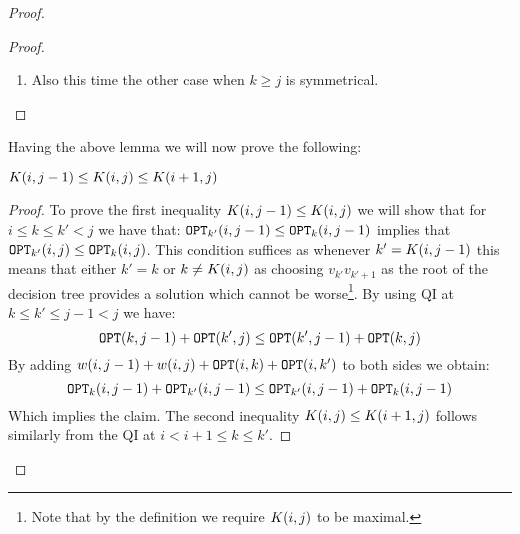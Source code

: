 \begin{theorem}
\begin{proof}
\begin{lemma}
\begin{proof}
\begin{enumerate}
\begin{enumerate}
        \begin{align*}
        &\OPT\br{i, j} + \OPT\br{i', j'} \\
        &\leq \OPT_z\br{i, j} + \OPT_y\br{i', j'} \\
        &=w\br{i, j} + w\br{i', j'} + \OPT\br{i, z} + \OPT_z\br{z+1, j} + \OPT_y\br{i', y} + \OPT_y\br{y+1, j'} \\
        &\leq w\br{i', j} + w\br{i, j'} + \OPT\br{i, z} + \OPT_y\br{i', y} + \OPT_z\br{y+1, j} + \OPT_y\br{z+1, j'}\\
        &= \OPT_y\br{i', j} + \OPT_z\br{i, j'} \\
        &= \OPT\br{i', j} + \OPT\br{i, j'}
        \end{align*}
        Where the first inequality and the first equality are due to the definition of $\OPT_k$, the second inequality is due to QI of $w$ and the induction hypothesis at $z\leq y<j < j'$ and the last two equalities are again due to the definition of $\OPT_k$.
        \item Also this time the other case when $k\geq j$ is symmetrical.
    \end{enumerate}
\end{enumerate} 
   \end{proof}
\end{lemma} 
Having the above lemma we will now prove the following:
\begin{lemma}
   $K\mathopen{}\left( i,j-1 \right)\leq K\mathopen{}\left( i,j \right)\leq K\mathopen{}\left( i +1,j \right)$
   \begin{proof}
   To prove the first inequality $K\mathopen{}\left( i,j-1 \right)\leq K\mathopen{}\left( i,j \right)$ we will show that for $i\leq k \leq k' < j$ we have that: $\texttt{OPT}_{k'}\mathopen{}\left( i, j - 1 \right) \leq \texttt{OPT}_{k}\mathopen{}\left( i, j - 1 \right)$ implies that $\texttt{OPT}_{k'}\mathopen{}\left( i, j \right) \leq \texttt{OPT}_{k}\mathopen{}\left( i, j \right)$. This condition suffices as whenever $k'=K\mathopen{}\left( i, j - 1 \right)$ this means that either $k'=k$ or $k\neq K\mathopen{}\left( i, j \right)$ as choosing $v_{k'}v_{k'+1}$ as the root of the decision tree provides a solution which cannot be worse\footnote{Note that by the definition we require $K\mathopen{}\left( i, j \right)$ to be maximal.}. By using QI at $k\leq k'\leq j -1< j$ we have:
   $$
   \texttt{OPT}\mathopen{}\left( k, j-1 \right) + \texttt{OPT}\mathopen{}\left( k', j \right)\leq \texttt{OPT}\mathopen{}\left( k', j-1 \right) + \texttt{OPT}\mathopen{}\left( k, j \right)
   $$
   By adding $w\mathopen{}\left( i,j-1 \right)+w\mathopen{}\left( i,j \right)+\texttt{OPT}\mathopen{}\left( i, k \right)+\texttt{OPT}\mathopen{}\left( i, k' \right)$ to both sides we obtain:
   $$
   \texttt{OPT}_k\mathopen{}\left( i, j-1 \right) + \texttt{OPT}_{k'}\mathopen{}\left( i, j-1 \right) \leq \texttt{OPT}_{k'}\mathopen{}\left( i, j-1 \right) + \texttt{OPT}_{k}\mathopen{}\left( i, j-1 \right)
   $$
   Which implies the claim. 
   The second inequality $K\mathopen{}\left( i,j \right)\leq K\mathopen{}\left( i +1,j \right)$ follows similarly from the QI at $i < i+1 \leq k \leq k' $.
   \end{proof}
\end{lemma}
 

\end{proof}
\end{theorem}
